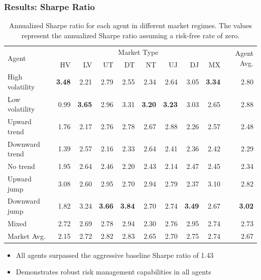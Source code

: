\documentclass{beamer}
\begin{document}
\begin{frame}
  \frametitle{Results: Sharpe Ratio}

  \begin{table}[htbp]
    \fontsize{7}{9}\selectfont
    \centering
    \caption{Annualized Sharpe ratio for each agent in different market regimes. The values represent the annualized Sharpe ratio assuming a risk-free rate of zero.}
    \begin{tabular}{l|rrrrrrrr|r}
    \hline
    \multirow{2}{*}{Agent} & \multicolumn{8}{c|}{Market Type} & \multirow{2}{*}{Agent Avg.} \\
    \cline{2-9}
    & HV &  LV &  UT &  DT &  NT &  UJ &  DJ & MX \\
    \hline
    High volatility &      \textbf{3.48} &     2.21 &      2.79 &        2.55 &      2.34 &     2.64 &       3.05 &   \textbf{3.34} &        2.80 \\
    Low volatility  &      0.99 &     \textbf{3.65} &      2.96 &        3.31 &      \textbf{3.20} &     \textbf{3.23} &       3.03 &   2.65 &        2.88 \\
    Upward trend    &      1.76 &     2.17 &      2.76 &        2.78 &      2.67 &     2.88 &       2.26 &   2.57 &        2.48 \\
    Downward trend  &      1.39 &     2.57 &      2.16 &        2.33 &      2.64 &     2.41 &       2.36 &   2.42 &        2.29 \\
    No trend        &      1.95 &     2.64 &      2.46 &        2.20 &      2.43 &     2.14 &       2.47 &   2.45 &        2.34 \\
    Upward jump     &      3.08 &     2.60 &      2.95 &        2.70 &      2.94 &     2.79 &       2.37 &   3.10 &        2.82 \\
    Downward jump   &      1.82 &     3.24 &      \textbf{3.66} &        \textbf{3.84} &      2.70 &     2.74 &       \textbf{3.49} &   2.67 &        \textbf{3.02} \\
    Mixed           &      2.72 &     2.69 &      2.78 &        2.94 &      2.30 &     2.76 &       2.95 &   2.74 &        2.73 \\
    \hline
    Market Avg.     &      2.15 &     2.72 &      2.82 &        2.83 &      2.65 &     2.70 &       2.75 &   2.74 &        2.67 \\
    \end{tabular}
  \end{table}

  \begin{itemize}
    \item All agents surpassed the aggressive baseline Sharpe ratio of 1.43
    \item Demonstrates robust risk management capabilities in all agents
  \end{itemize}
  
\end{frame}
\end{document}
